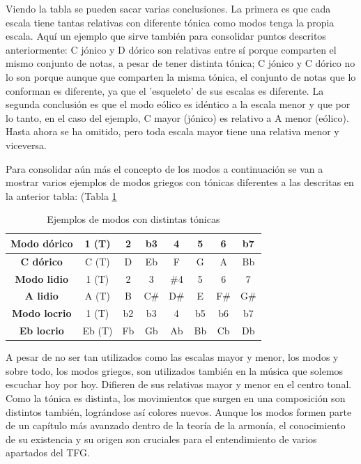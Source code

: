 Viendo la tabla se pueden sacar varias conclusiones. La primera es que cada escala tiene tantas relativas con diferente tónica como modos tenga la propia escala. Aquí un ejemplo que sirve también para consolidar puntos descritos anteriormente: C jónico y D dórico son relativas entre sí porque comparten el mismo conjunto de notas, a pesar de tener distinta tónica; C jónico y C dórico no lo son porque aunque que comparten la misma tónica, el conjunto de notas que lo conforman es diferente, ya que el 'esqueleto' de sus escalas es diferente. La segunda conclusión es que el modo eólico es idéntico a la escala menor y que por lo tanto, en el caso del ejemplo, C mayor (jónico) es relativo a A menor (eólico). Hasta ahora se ha omitido, pero toda escala mayor tiene una relativa menor y viceversa.

Para consolidar aún más el concepto de los modos a continuación se van a mostrar varios ejemplos de modos griegos con tónicas diferentes a las descritas en la anterior tabla: (Tabla \ref{tab:otros_modos}

\begin{table}[H]
    \centering
    \begin{tabular}{c|c|c|c|c|c|c|c}       
        \textbf{Modo dórico} & 1 (T) & 2 & b3 & 4 & 5 & 6 & b7  \\
        \hline
        \textbf{C dórico} & C (T) & D & Eb & F & G & A & Bb  \\     
        \hline
        \hline
        \textbf{Modo lidio} & 1 (T) & 2 & 3 & \#4 & 5 & 6 & 7  \\
        \hline
        \textbf{A lidio} & A (T) & B & C\# & D\# & E & F\# & G\#    \\   
        \hline
        \hline
        \textbf{Modo locrio} & 1 (T) & b2 & b3 & 4 & b5 & b6 & b7  \\
        \hline
        \textbf{Eb locrio} & Eb (T) & Fb & Gb & Ab & Bb & Cb & Db  \\ 
    \end{tabular}
    \caption{Ejemplos de modos con distintas tónicas}
    \label{tab:otros_modos}
\end{table}

A pesar de no ser tan utilizados como las escalas mayor y menor, los modos y sobre todo, los modos griegos, son utilizados también en la música que solemos escuchar hoy por hoy. Difieren de sus relativas mayor y menor en el centro tonal. Como la tónica es distinta, los movimientos que surgen en una composición son distintos también, lográndose así colores nuevos. Aunque los modos formen parte de un capítulo más avanzado dentro de la teoría de la armonía, el conocimiento de su existencia y su origen son cruciales para el entendimiento de varios apartados del TFG.


